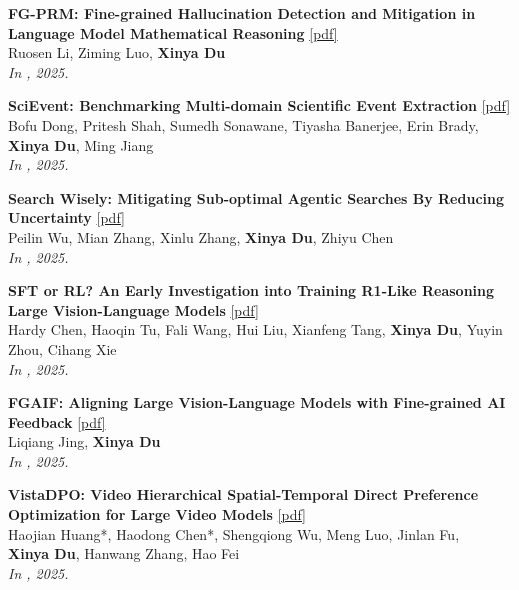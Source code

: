 \begin{enumerate}[{[}1{]},leftmargin=*]
\parbox{\textwidth}{
\item 
{\bf FG-PRM: Fine-grained Hallucination Detection and Mitigation in Language Model Mathematical Reasoning}
\href{https://aclanthology.org/2025.findings-emnlp.228.pdf}{{{[pdf]}}} \\
Ruosen Li, Ziming Luo, \textbf{Xinya Du} \\
{\it In \EMNLPfinding, 2025.} \\
}

\parbox{\textwidth}{
\item 
{\bf SciEvent: Benchmarking Multi-domain Scientific Event Extraction}
\href{https://aclanthology.org/2025.emnlp-main.871.pdf}{{{[pdf]}}} \\
Bofu Dong, Pritesh Shah, Sumedh Sonawane, Tiyasha Banerjee, Erin Brady, \textbf{Xinya Du}, Ming Jiang \\
{\it In \EMNLP, 2025.} \\
}

\parbox{\textwidth}{
\item 
{\bf Search Wisely: Mitigating Sub-optimal Agentic Searches By Reducing Uncertainty} 
\href{https://aclanthology.org/2025.emnlp-main.998.pdf}{{{[pdf]}}} \\
Peilin Wu, Mian Zhang, Xinlu Zhang, \textbf{Xinya Du}, Zhiyu Chen \\
{\it In \EMNLP, 2025.} \\
}


\parbox{\textwidth}{
\item 
{\bf SFT or RL? An Early Investigation into Training R1-Like Reasoning Large Vision-Language Models} 
\href{https://openreview.net/pdf?id=wZI5qkQeDF}{{{[pdf]}}} \\
     Hardy Chen, Haoqin Tu, Fali Wang, Hui Liu, Xianfeng Tang, \textbf{Xinya Du}, Yuyin Zhou, Cihang Xie \\
{\it In \TMLR, 2025.} \\
}

\parbox{\textwidth}{
\item 
{\bf FGAIF: Aligning Large Vision-Language Models with Fine-grained AI Feedback}
\href{https://openreview.net/pdf?id=Qhfw5CUVd7}{{{[pdf]}}} \\
     Liqiang Jing, \textbf{Xinya Du}\\
{\it In \TMLR, 2025.} \\
}

\parbox{\textwidth}{
\item 
{\bf VistaDPO: Video Hierarchical Spatial-Temporal Direct Preference Optimization for Large Video Models } 
\href{https://arxiv.org/pdf/2504.13122}{{{[pdf]}}} \\
     Haojian Huang*, Haodong Chen*, Shengqiong Wu, Meng Luo, Jinlan Fu, \\ \textbf{Xinya Du}, Hanwang Zhang, Hao Fei\\
{\it In \ICML, 2025.} \\
}


\end{enumerate}

